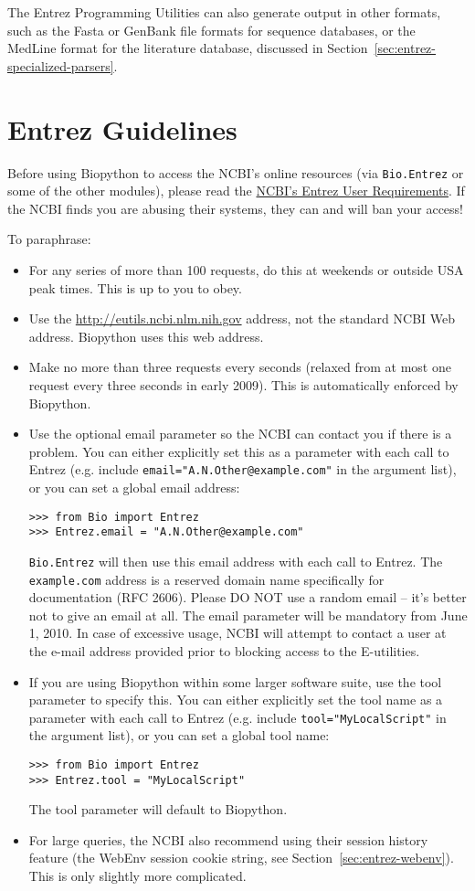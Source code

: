 \documentclass{report}
\begin{document}
The Entrez Programming Utilities can also generate output in other formats, such as the Fasta or GenBank file formats for sequence databases, or the MedLine format for the literature database, discussed in Section~\ref{sec:entrez-specialized-parsers}.

\section{Entrez Guidelines}
\label{sec:entrez-guidelines}
Before using Biopython to access the NCBI's online resources (via \verb|Bio.Entrez| or some of the other modules), please read the
\href{http://www.ncbi.nlm.nih.gov/books/NBK25497/#chapter2.Usage_Guidelines_and_Requiremen}{NCBI's Entrez User Requirements}.
If the NCBI finds you are abusing their systems, they can and will ban your access! 

To paraphrase:

\begin{itemize}
\item For any series of more than 100 requests, do this at weekends or outside USA peak times.  This is up to you to obey.
\item Use the \url{http://eutils.ncbi.nlm.nih.gov} address, not the standard NCBI Web address.  Biopython uses this web address.
\item Make no more than three requests every seconds (relaxed from at most one request every three seconds in early 2009).  This is automatically enforced by Biopython.
\item Use the optional email parameter so the NCBI can contact you if there is a problem.  You can either explicitly set this as a parameter with each call to Entrez (e.g. include {\tt email="A.N.Other@example.com"} in the argument list), or you can set a global email address:
\begin{verbatim}
>>> from Bio import Entrez
>>> Entrez.email = "A.N.Other@example.com"
\end{verbatim}
{\tt Bio.Entrez} will then use this email address with each call to Entrez.  The {\tt example.com} address is a reserved domain name specifically for documentation (RFC 2606).  Please DO NOT use a random email -- it's better not to give an email at all. The email parameter will be mandatory from June 1, 2010. In case of excessive usage, NCBI will attempt to contact a user at the e-mail address provided prior to blocking access to the E-utilities.
\item If you are using Biopython within some larger software suite, use the tool parameter to specify this.  You can either explicitly set the tool name as a parameter with each call to Entrez (e.g. include {\tt tool="MyLocalScript"} in the argument list), or you can set a global tool name:
\begin{verbatim}
>>> from Bio import Entrez
>>> Entrez.tool = "MyLocalScript"
\end{verbatim}
The tool parameter will default to Biopython.
\item For large queries, the NCBI also recommend using their session history feature (the WebEnv session cookie string, see Section~\ref{sec:entrez-webenv}).  This is only slightly more complicated.
\end{itemize}
\end{document}
